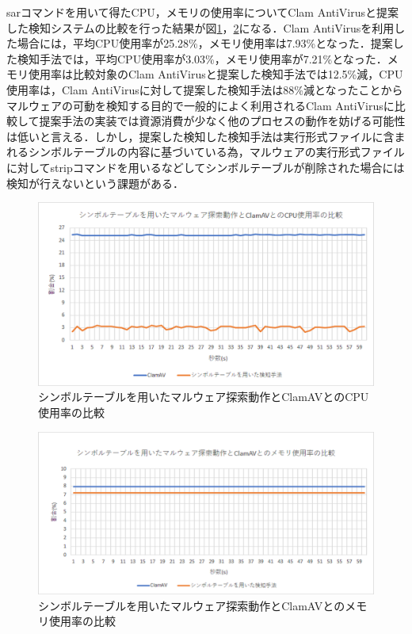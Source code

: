 
sarコマンドを用いて得たCPU，メモリの使用率についてClam AntiVirusと提案した検知システムの比較を行った結果が図\ref{fig:symbol_cpu}，\ref{fig:symbol_mem}になる．Clam AntiVirusを利用した場合には，平均CPU使用率が25.28\%，メモリ使用率は7.93\%となった．提案した検知手法では，平均CPU使用率が3.03\%，メモリ使用率が7.21\%となった．メモリ使用率は比較対象のClam AntiVirusと提案した検知手法では12.5\%減，CPU使用率は，Clam AntiVirusに対して提案した検知手法は88\%減となったことからマルウェアの可動を検知する目的で一般的によく利用されるClam AntiVirusに比較して提案手法の実装では資源消費が少なく他のプロセスの動作を妨げる可能性は低いと言える．しかし，提案した検知した検知手法は実行形式ファイルに含まれるシンボルテーブルの内容に基づいている為，マルウェアの実行形式ファイルに対してstripコマンドを用いるなどしてシンボルテーブルが削除された場合には検知が行えないという課題がある．

\begin{figure}[h]
 \centering
    \includegraphics[width=120mm]{figures/cpu.eps}
 \caption{シンボルテーブルを用いたマルウェア探索動作とClamAVとのCPU使用率の比較}
 \label{fig:symbol_cpu}
 \end{figure}
 
 
\begin{figure}[h]
 \centering
    \includegraphics[width=120mm]{figures/mem.eps}
   \caption{シンボルテーブルを用いたマルウェア探索動作とClamAVとのメモリ使用率の比較}
    \label{fig:symbol_mem}
 \end{figure}
